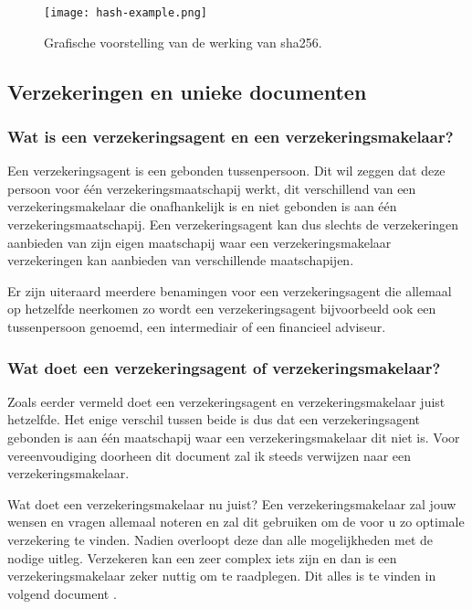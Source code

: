  \begin{figure}
 	\texttt{[image: hash-example.png]}
 	\caption{Grafische voorstelling van de werking van sha256.}
 	\label{fig:hash-example}
 \end{figure}



\subsection{Verzekeringen en unieke documenten}
\subsubsection{Wat is een verzekeringsagent en een verzekeringsmakelaar?}
Een verzekeringsagent is een gebonden tussenpersoon. Dit wil zeggen dat deze persoon voor één verzekeringsmaatschapij werkt, dit verschillend van een verzekeringsmakelaar die onafhankelijk is en niet gebonden is aan één verzekeringsmaatschapij. Een verzekeringsagent kan dus slechts de verzekeringen aanbieden van zijn eigen maatschapij waar een verzekeringsmakelaar verzekeringen kan aanbieden van verschillende maatschapijen. 

Er zijn uiteraard meerdere benamingen voor een verzekeringsagent die allemaal op hetzelfde neerkomen zo wordt een verzekeringsagent bijvoorbeeld ook een tussenpersoon genoemd, een intermediair of een financieel adviseur. 

\subsubsection{Wat doet een verzekeringsagent of verzekeringsmakelaar?}
Zoals eerder vermeld doet een verzekeringsagent en verzekeringsmakelaar juist hetzelfde. Het enige verschil tussen beide is dus dat een verzekeringsagent gebonden is aan één maatschapij waar een verzekeringsmakelaar dit niet is. Voor vereenvoudiging doorheen dit document zal ik steeds verwijzen naar een verzekeringsmakelaar. 

Wat doet een verzekeringsmakelaar nu juist? Een verzekeringsmakelaar zal jouw wensen en vragen allemaal noteren en zal dit gebruiken om de voor u zo optimale verzekering te vinden. Nadien overloopt deze dan alle mogelijkheden met de nodige uitleg. Verzekeren kan een zeer complex iets zijn en dan is een verzekeringsmakelaar zeker nuttig om te raadplegen. Dit alles is te vinden in volgend document \textcite{Verzekeruzelf.nl}.

